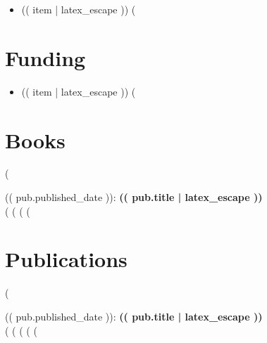 \documentclass[10pt]{article}
\begin{document}
\begin{itemize}
(%
  \item (( item | latex_escape ))
(%
\end{itemize}

\section{Funding}

\begin{itemize}
(%
  \item (( item | latex_escape ))
(%
\end{itemize}

\section{Books}

\begin{etaremune}
(%
\item
  (( pub.published_date )): \textbf{(( pub.title | latex_escape ))}\\
  (%
  (%
  (%
(%
\end{etaremune}

\section{Publications}

\begin{etaremune}
(%
\item
  (( pub.published_date )): \textbf{(( pub.title | latex_escape ))}\\
  (%
  (%
  (%
  (%
(%
\end{etaremune}
\end{document}
